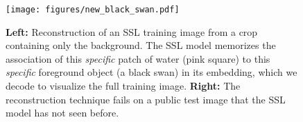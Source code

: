 \begin{figure}[t]
    \centering
    \texttt{[image: figures/new\_black\_swan.pdf]}
    \caption[Reconstruction of an SSL training image from a crop containing only the background.]{\textbf{Left:} Reconstruction of an SSL training image from a crop containing only the background. The SSL model memorizes the association of this \emph{specific} patch of water (pink square) to this \emph{specific} foreground object (a black swan) in its embedding, which we decode to visualize the full training image. \textbf{Right:} The reconstruction technique fails on a public test image that the SSL model has not seen before.}
    \label{fig:black_swan}
\end{figure}
